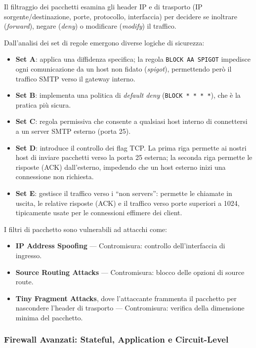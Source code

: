 Il filtraggio dei pacchetti esamina gli header IP e di trasporto (IP sorgente/destinazione, 
porte, protocollo, interfaccia) per decidere se inoltrare (\textit{forward}), negare 
(\textit{deny}) o modificare (\textit{modify}) il traffico.

Dall'analisi dei set di regole emergono diverse logiche di sicurezza:

\begin{itemize}
    \item \textbf{Set A}: applica una diffidenza specifica; la regola \texttt{BLOCK AA SPIGOT} 
    impedisce ogni comunicazione da un host non fidato (\textit{spigot}), permettendo però il 
    traffico SMTP verso il gateway interno.
    \item \textbf{Set B}: implementa una politica di \textit{default deny} (\texttt{BLOCK * * * *}), 
    che è la pratica più sicura.
    \item \textbf{Set C}: regola permissiva che consente a qualsiasi host interno di connettersi 
    a un server SMTP esterno (porta 25).
    \item \textbf{Set D}: introduce il controllo dei flag TCP. La prima riga permette ai nostri 
    host di inviare pacchetti verso la porta 25 esterna; la seconda riga permette le risposte 
    (ACK) dall'esterno, impedendo che un host esterno inizi una connessione non richiesta.
    \item \textbf{Set E}: gestisce il traffico verso i ``non servers'': permette le chiamate 
    in uscita, le relative risposte (ACK) e il traffico verso porte superiori a 1024, tipicamente 
    usate per le connessioni effimere dei client.
\end{itemize}

I filtri di pacchetto sono vulnerabili ad attacchi come:
\begin{itemize}
    \item \textbf{IP Address Spoofing} --- Contromisura: controllo dell'interfaccia di ingresso.
    \item \textbf{Source Routing Attacks} --- Contromisura: blocco delle opzioni di source route.
    \item \textbf{Tiny Fragment Attacks}, dove l'attaccante frammenta il pacchetto per nascondere 
    l'header di trasporto --- Contromisura: verifica della dimensione minima del pacchetto.
\end{itemize}

\subsubsection{Firewall Avanzati: Stateful, Application e Circuit-Level}

